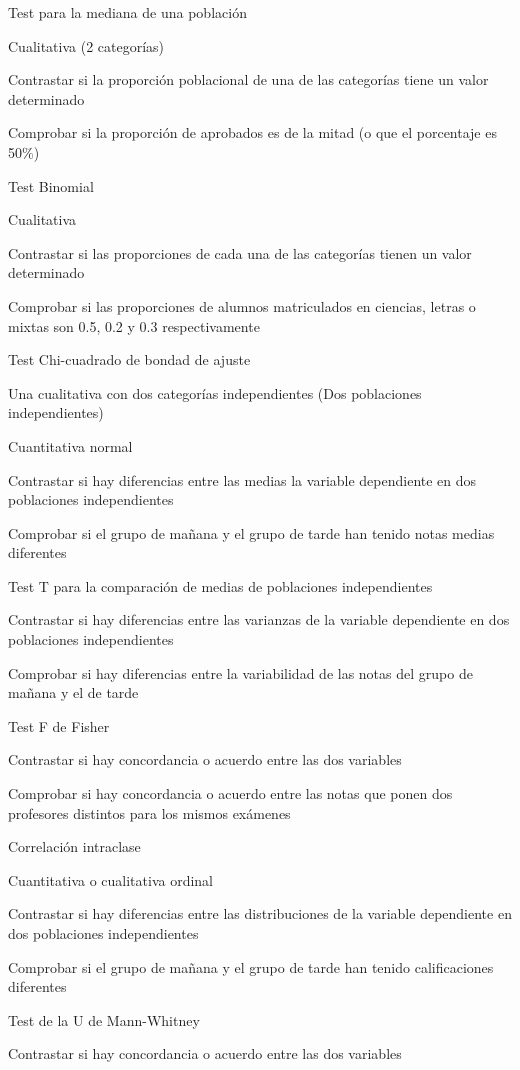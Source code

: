 \documentclass[
  a4paper,
]{scrreport}
\theoremstyle{definition}
\theoremstyle{definition}
\theoremstyle{remark}
\begin{document}
Test para la mediana de una población

Cualitativa (2 categorías)

Contrastar si la proporción poblacional de una de las categorías tiene
un valor determinado

Comprobar si la proporción de aprobados es de la mitad (o que el
porcentaje es 50\%)

Test Binomial

Cualitativa

Contrastar si las proporciones de cada una de las categorías tienen un
valor determinado

Comprobar si las proporciones de alumnos matriculados en ciencias,
letras o mixtas son 0.5, 0.2 y 0.3 respectivamente

Test Chi-cuadrado de bondad de ajuste

Una cualitativa con dos categorías independientes (Dos poblaciones
independientes)

Cuantitativa normal

Contrastar si hay diferencias entre las medias la variable dependiente
en dos poblaciones independientes

Comprobar si el grupo de mañana y el grupo de tarde han tenido notas
medias diferentes

Test T para la comparación de medias de poblaciones independientes

Contrastar si hay diferencias entre las varianzas de la variable
dependiente en dos poblaciones independientes

Comprobar si hay diferencias entre la variabilidad de las notas del
grupo de mañana y el de tarde

Test F de Fisher

Contrastar si hay concordancia o acuerdo entre las dos variables

Comprobar si hay concordancia o acuerdo entre las notas que ponen dos
profesores distintos para los mismos exámenes

Correlación intraclase

Cuantitativa o cualitativa ordinal

Contrastar si hay diferencias entre las distribuciones de la variable
dependiente en dos poblaciones independientes

Comprobar si el grupo de mañana y el grupo de tarde han tenido
calificaciones diferentes

Test de la U de Mann-Whitney

Contrastar si hay concordancia o acuerdo entre las dos variables
\end{document}
